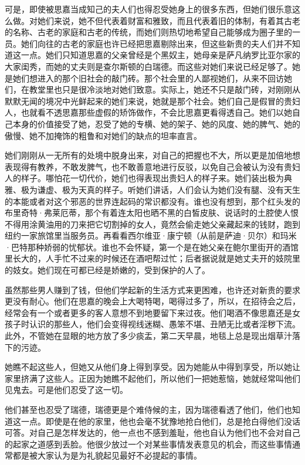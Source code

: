 \par 可是，即使被思嘉当成知己的夫人们也得忍受她身上的很多东西，但她们很乐意这么做。对她们来说，她不但代表着财富和雅致，而且代表着旧的体制，有着其古老的名称、古老的家庭和古老的传统，而她们则热切地希望自己能够成为圈子里的一员。她们向往的古老的家庭也许已经把思嘉剔除出来，但这些新贵的夫人们并不知道这一点。她们只知道思嘉的父亲曾经是个黑奴主，她母亲是萨凡纳罗比亚尔家的大家闺秀，而她的丈夫则是查尔斯顿的白瑞德。而这些对她们来说已经足够了。她是她们想进入的那个旧社会的敲门砖。那个社会里的人鄙视她们，从来不回访她们，在教堂里也只是很冷淡地对她们致意。实际上，她还不只是敲门砖，对刚刚从默默无闻的境况中光鲜起来的她们来说，她就是那个社会。她们自己是假冒的贵妇人，也就看不透思嘉那些虚假的矫饰做作，不会比思嘉更看得透自己。她们以她自己本身的价值接受了她，忍受了她的专横、她的架子、她的风度、她的脾气、她的傲慢、她不加掩饰的粗鲁和对她们的缺点的坦率直言。
\par 她们刚刚从一无所有的处境中脱身出来，对自己的把握也不大，所以更是加倍地想表现得有教养，不敢发脾气，也不敢善意地进行反驳，以免自己会被认为没有贵妇人的样子。哪怕花一切代价，她们也得表现出贵妇人的样子来。她们装出极为典雅、极为谦虚、极为天真的样子。听她们讲话，人们会认为她们没有腿、没有天生的本能或者对这个邪恶的世界连起码的常识都没有。谁也没有想到，那个红头发的布里奇特·弗莱厄蒂，那个有着连太阳也晒不黑的白皙皮肤、说话时的土腔使人恨不得用涂黄油用的刀来把它切割掉的女人，竟然会偷走她父亲藏起来的钱财，跑到纽约一家旅馆里当服务员。再看看西尔维亚·康宁顿（从前是萨迪·贝尔）和玛米·巴特那种娇弱的忧郁状。谁也不会怀疑，第一个是在她父亲在鲍尔里街开的酒馆里长大的，人手忙不过来的时候还在酒吧帮过忙；后者据说就是她丈夫开的妓院里的妓女。她们现在可都已经是娇嫩的，受到保护的人了。
\par 虽然那些男人赚到了钱，但他们学起新的生活方式来更困难，也许还对新贵的要求更没有耐心。他们在思嘉的晚会上大喝特喝，喝得过多了，所以，在招待会之后，经常会有一个或者更多的客人意想不到地要留下来过夜。他们喝酒不像思嘉还是女孩子时认识的那些人，他们会变得视线迷糊、愚笨不堪、丑陋无比或者淫秽下流。此外，不管她在显眼的地方放了多少痰盂，第二天早晨，地毯上总是现出烟草汁落下的污迹。
\par 她瞧不起这些人，但她又从他们身上得到享受。因为她能从中得到享受，所以她让家里挤满了这些人。正因为她瞧不起他们，所以他们一把她惹恼，她就经常叫他们见鬼去。可是他们忍受了这一切。
\par 他们甚至也忍受了瑞德，瑞德更是个难侍候的主，因为瑞德看透了他们，他们也知道这一点。即使是在他的家里，他也会毫不犹豫地抢白他们，总是抢白得他们没话可答。对自己是怎样发达的，他一点也不感到羞耻，他也自认为他们也不会对自己的起家之道感到丢脸。他很少放过一个对某些事情发表意见的机会，而这些事情通常都是被大家认为是为礼貌起见最好不必提起的事情。
